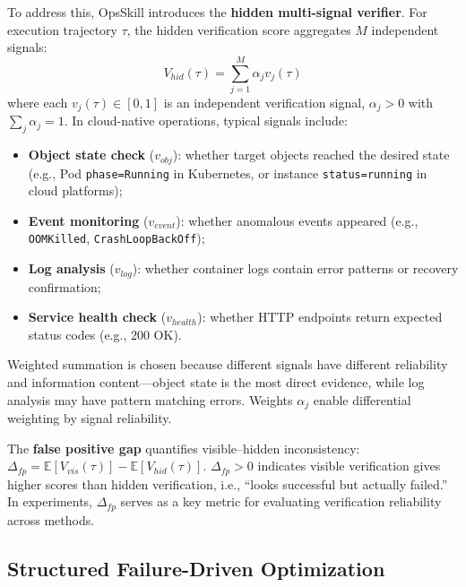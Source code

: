 \documentclass[conference,10pt]{IEEEtran}
\begin{document}
To address this, OpsSkill introduces the \textbf{hidden multi-signal verifier}.
For execution trajectory $\tau$, the hidden verification score aggregates $M$ independent signals:
\begin{equation}
V_{hid}(\tau) = \sum_{j=1}^{M} \alpha_j v_j(\tau)
\end{equation}
where each $v_j(\tau) \in [0, 1]$ is an independent verification signal, $\alpha_j > 0$ with $\sum_j \alpha_j = 1$.
In cloud-native operations, typical signals include:
\begin{itemize}
  \item \textbf{Object state check} ($v_{obj}$): whether target objects reached the desired state (e.g., Pod \texttt{phase=Running} in Kubernetes, or instance \texttt{status=running} in cloud platforms);
  \item \textbf{Event monitoring} ($v_{event}$): whether anomalous events appeared (e.g., \texttt{OOMKilled}, \texttt{CrashLoopBackOff});
  \item \textbf{Log analysis} ($v_{log}$): whether container logs contain error patterns or recovery confirmation;
  \item \textbf{Service health check} ($v_{health}$): whether HTTP endpoints return expected status codes (e.g., 200 OK).
\end{itemize}
Weighted summation is chosen because different signals have different reliability and information content---object state is the most direct evidence, while log analysis may have pattern matching errors.
Weights $\alpha_j$ enable differential weighting by signal reliability.

The \textbf{false positive gap} quantifies visible--hidden inconsistency:
$\Delta_{fp} = \mathbb{E}[V_{vis}(\tau)] - \mathbb{E}[V_{hid}(\tau)]$.
$\Delta_{fp} > 0$ indicates visible verification gives higher scores than hidden verification, i.e., ``looks successful but actually failed.''
In experiments, $\Delta_{fp}$ serves as a key metric for evaluating verification reliability across methods.

\subsection{Structured Failure-Driven Optimization}
\end{document}
